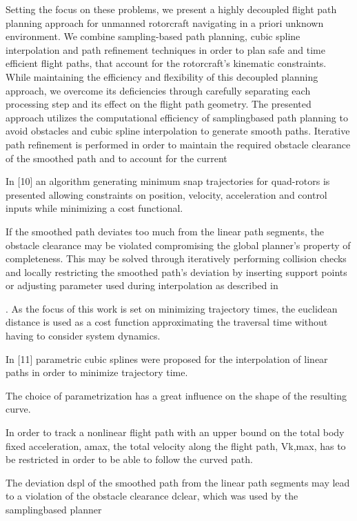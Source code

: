 \documentclass[a4paper]{report}
\begin{document}
Setting the focus on these problems, we present a highly
decoupled flight path planning approach for unmanned rotorcraft
navigating in a priori unknown environment. We combine
sampling-based path planning, cubic spline interpolation
and path refinement techniques in order to plan safe and
time efficient flight paths, that account for the rotorcraft’s
kinematic constraints. While maintaining the efficiency and
flexibility of this decoupled planning approach, we overcome
its deficiencies through carefully separating each processing
step and its effect on the flight path geometry. The presented
approach utilizes the computational efficiency of samplingbased
path planning to avoid obstacles and cubic spline
interpolation to generate smooth paths. Iterative path refinement
is performed in order to maintain the required obstacle
clearance of the smoothed path and to account for the current

In
[10] an algorithm generating minimum snap trajectories for
quad-rotors is presented allowing constraints on position,
velocity, acceleration and control inputs while minimizing a
cost functional. 

If the smoothed path deviates too much from the
linear path segments, the obstacle clearance may be violated
compromising the global planner’s property of completeness.
This may be solved through iteratively performing collision
checks and locally restricting the smoothed path’s deviation
by inserting support points or adjusting parameter used
during interpolation as described in

. As the focus of this work is
set on minimizing trajectory times, the euclidean distance
is used as a cost function approximating the traversal time
without having to consider system dynamics.

In [11] parametric cubic splines were proposed for the
interpolation of linear paths in order to minimize trajectory
time. 

The
choice of parametrization has a great influence on the shape
of the resulting curve.

In order to track a nonlinear flight path with an upper
bound on the total body fixed acceleration, amax, the total
velocity along the flight path, Vk,max, has to be restricted
in order to be able to follow the curved path. 

The deviation dspl of the smoothed path from the
linear path segments may lead to a violation of the obstacle
clearance dclear, which was used by the samplingbased
planner
\end{document}
